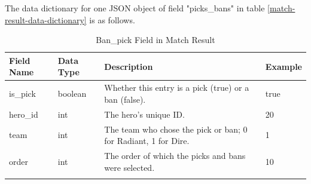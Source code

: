 \documentclass{article}
\begin{document}
The data dictionary for one JSON object of field "picks\_bans" in table \ref{match-result-data-dictionary} is as follows.

\begin{longtable}{|p{3cm}|p{2cm}|p{5cm}|p{3cm}|}

\hline
\textbf{Field Name} & \textbf{Data Type} & \textbf{Description}  & \textbf{Example} \\
\hline
\endhead

is\_pick & boolean & Whether this entry is a pick (true) or a ban (false). & true \\
\hline
hero\_id & int & The hero's unique ID. & 20 \\
\hline
team & int & The team who chose the pick or ban; 0 for Radiant, 1 for Dire. & 1 \\
\hline
order & int & The order of which the picks and bans were selected. & 10 \\
\hline
\caption{Ban\_pick Field in Match Result}
\end{longtable}
\label{ban-pick-in-match-result}
\end{document}
